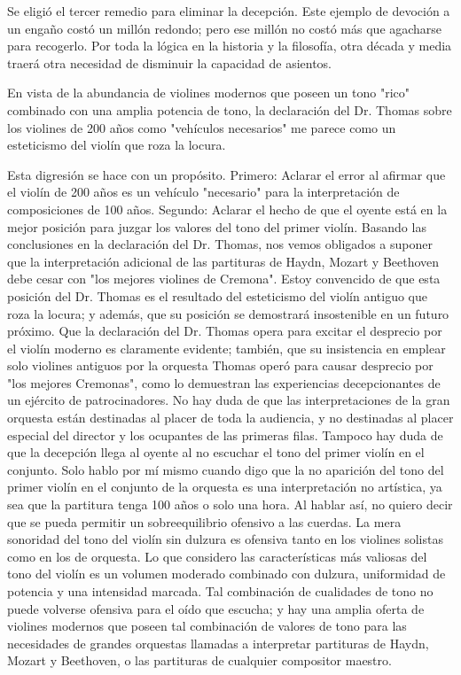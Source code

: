 \documentclass[12pt]{book}
\begin{document}
Se eligió el tercer remedio para eliminar la decepción. Este ejemplo de devoción a un engaño costó un millón redondo; pero ese millón no costó más que agacharse para recogerlo. Por toda la lógica en la historia y la filosofía, otra década y media traerá otra necesidad de disminuir la capacidad de asientos.

En vista de la abundancia de violines modernos que poseen un tono "rico" combinado con una amplia potencia de tono, la declaración del Dr. Thomas sobre los violines de 200 años como "vehículos necesarios" me parece como un esteticismo del violín que roza la locura.

Esta digresión se hace con un propósito. Primero: Aclarar el error al afirmar que el violín de 200 años es un vehículo "necesario" para la interpretación de composiciones de 100 años. Segundo: Aclarar el hecho de que el oyente está en la mejor posición para juzgar los valores del tono del primer violín. Basando las conclusiones en la declaración del Dr. Thomas, nos vemos obligados a suponer que la interpretación adicional de las partituras de Haydn, Mozart y Beethoven debe cesar con "los mejores violines de Cremona". Estoy convencido de que esta posición del Dr. Thomas es el resultado del esteticismo del violín antiguo que roza la locura; y además, que su posición se demostrará insostenible en un futuro próximo. Que la declaración del Dr. Thomas opera para excitar el desprecio por el violín moderno es claramente evidente; también, que su insistencia en emplear solo violines antiguos por la orquesta Thomas operó para causar desprecio por "los mejores Cremonas", como lo demuestran las experiencias decepcionantes de un ejército de patrocinadores. No hay duda de que las interpretaciones de la gran orquesta están destinadas al placer de toda la audiencia, y no destinadas al placer especial del director y los ocupantes de las primeras filas. Tampoco hay duda de que la decepción llega al oyente al no escuchar el tono del primer violín en el conjunto. Solo hablo por mí mismo cuando digo que la no aparición del tono del primer violín en el conjunto de la orquesta es una interpretación no artística, ya sea que la partitura tenga 100 años o solo una hora. Al hablar así, no quiero decir que se pueda permitir un sobreequilibrio ofensivo a las cuerdas. La mera sonoridad del tono del violín sin dulzura es ofensiva tanto en los violines solistas como en los de orquesta. Lo que considero las características más valiosas del tono del violín es un volumen moderado combinado con dulzura, uniformidad de potencia y una intensidad marcada. Tal combinación de cualidades de tono no puede volverse ofensiva para el oído que escucha; y hay una amplia oferta de violines modernos que poseen tal combinación de valores de tono para las necesidades de grandes orquestas llamadas a interpretar partituras de Haydn, Mozart y Beethoven, o las partituras de cualquier compositor maestro.
\end{document}
